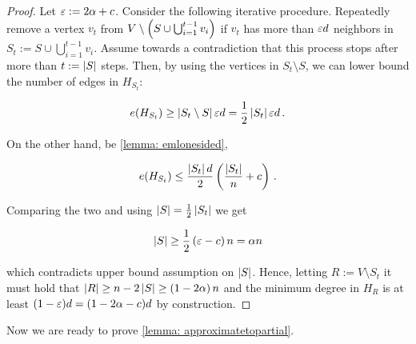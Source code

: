 

\begin{proof}
    Let $\varepsilon:=2\alpha + c$. Consider the following iterative procedure. Repeatedly remove a vertex $v_t$ from $V\setminus \left(S \cup \bigcup_{i=1}^{t-1} v_i\right)$ if $v_t$ has more than $\varepsilon d$ neighbors in $S_t := S \cup \bigcup_{i=1}^{t-1} v_i$. Assume towards a contradiction that this process stops after more than $t:=\left\lvert S\right\rvert$ steps. Then, by using the vertices in $S_t\setminus S$, we can lower bound the number of edges in $H_{S_t}$:

    $$e(H_{S_t})\geq \left\lvert S_t\setminus S\right\rvert \varepsilon d= \frac{1}{2}\left\lvert S_t\right\rvert\varepsilon d\,.$$

    On the other hand, be \cref{lemma: emlonesided},

    $$e(H_{S_t})\leq \frac{\left\lvert S_t\right\rvert d}{2}\left(\frac{\left\lvert S_t\right\rvert}{n} + c\right)\,.$$

    Comparing the two and using $\left\lvert S\right\rvert=\frac{1}{2}\left\lvert S_t\right\rvert$ we get

    $$\left\lvert S\right\rvert\geq\frac{1}{2}\left(\varepsilon-c\right)n=\alpha n$$

    which contradicts upper bound assumption on $\left\lvert S\right\rvert$. Hence, letting $R:=V\setminus S_t$ it must hold that $\left\lvert R\right\rvert\geq n-2\left\lvert S\right\rvert\geq \left(1-2\alpha\right)n$ and the minimum degree in $H_R$ is at least $(1-\varepsilon)d=(1-2\alpha-c)d$ by construction.
\end{proof}


Now we are ready to prove \cref{lemma: approximatetopartial}.


